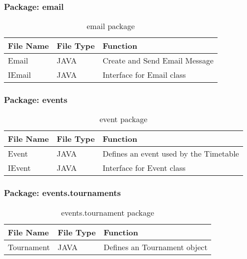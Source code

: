 \subsubsection{Package: email}
\begin{table}[H]
\begin{center}
    \begin{tabular}{| l | l | p{5cm} |}
    \hline
    File Name & File Type & Function\\ \hline
    Email & JAVA & Create and Send Email Message\\ \hline
	IEmail & JAVA & Interface for Email class\\ \hline	
    \end{tabular}
\end{center}
\caption{email package}
\end{table}

\subsubsection{Package: events}
\begin{table}[H]
\begin{center}
    \begin{tabular}{| l | l | p{5cm} |}
    \hline
    File Name & File Type & Function\\ \hline
    Event & JAVA & Defines an event used by the Timetable\\ \hline
	IEvent & JAVA & Interface for Event class\\ \hline	
    \end{tabular}
\end{center}
\caption{event package}
\end{table}

\subsubsection{Package: events.tournaments}
\begin{table}[H]
\begin{center}
    \begin{tabular}{| l | l | p{5cm} |}
    \hline
    File Name & File Type & Function\\ \hline
    Tournament & JAVA & Defines an Tournament object\\ \hline
    \end{tabular}
\end{center}
\caption{events.tournament package}
\end{table}

